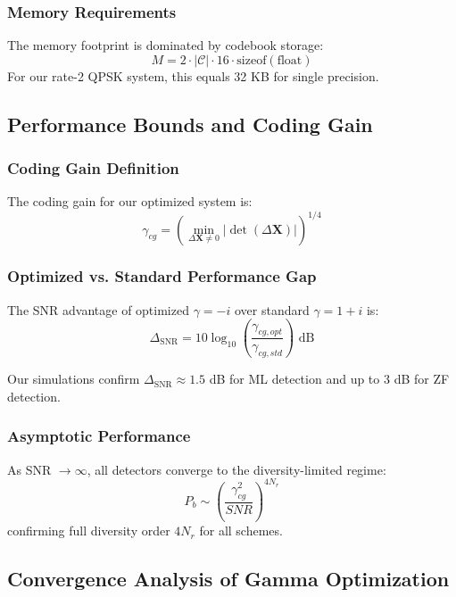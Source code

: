 \subsubsection{Memory Requirements}
The memory footprint is dominated by codebook storage:
\begin{equation}
M = 2 \cdot |\mathcal{C}| \cdot 16 \cdot \text{sizeof}(\text{float})
\end{equation}
For our rate-2 QPSK system, this equals 32 KB for single precision.

\subsection{Performance Bounds and Coding Gain}

\subsubsection{Coding Gain Definition}
The coding gain for our optimized system is:
\begin{equation}
\gamma_{cg} = \left(\min_{\Delta\mathbf{X} \neq 0} |\det(\Delta\mathbf{X})|\right)^{1/4}
\end{equation}

\subsubsection{Optimized vs. Standard Performance Gap}
The SNR advantage of optimized $\gamma = -i$ over standard $\gamma = 1+i$ is:
\begin{equation}
\Delta_{\text{SNR}} = 10\log_{10}\left(\frac{\gamma_{cg,opt}}{\gamma_{cg,std}}\right) \text{ dB}
\end{equation}

Our simulations confirm $\Delta_{\text{SNR}} \approx 1.5$ dB for ML detection and up to 3 dB for ZF detection.

\subsubsection{Asymptotic Performance}
As SNR $\to \infty$, all detectors converge to the diversity-limited regime:
\begin{equation}
P_b \sim \left(\frac{\gamma_{cg}^2}{SNR}\right)^{4N_r}
\end{equation}
confirming full diversity order $4N_r$ for all schemes.

\subsection{Convergence Analysis of Gamma Optimization}

